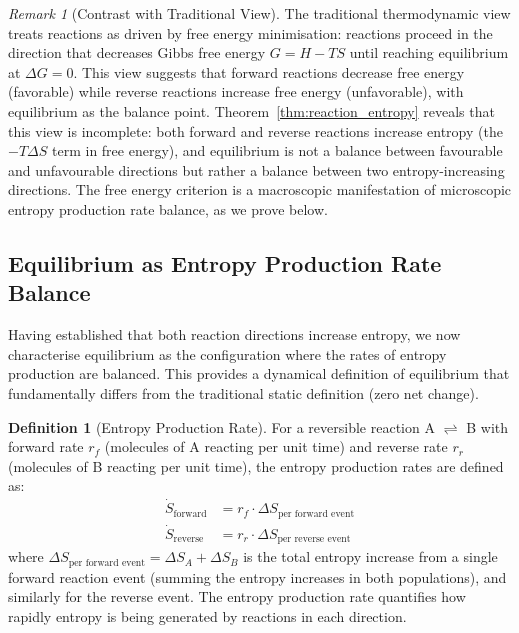 \documentclass[12pt,a4paper]{article}
\theoremstyle{definition}
\newtheorem{definition}[theorem]{Definition}
\theoremstyle{remark}
\newtheorem{remark}[theorem]{Remark}
\begin{document}
\begin{remark}[Contrast with Traditional View]
\label{rem:contrast_traditional_reaction}
The traditional thermodynamic view treats reactions as driven by free energy minimisation: reactions proceed in the direction that decreases Gibbs free energy $G = H - TS$ until reaching equilibrium at $\Delta G = 0$. This view suggests that forward reactions decrease free energy (favorable) while reverse reactions increase free energy (unfavorable), with equilibrium as the balance point. Theorem~\ref{thm:reaction_entropy} reveals that this view is incomplete: both forward and reverse reactions increase entropy (the $-T\Delta S$ term in free energy), and equilibrium is not a balance between favourable and unfavourable directions but rather a balance between two entropy-increasing directions. The free energy criterion is a macroscopic manifestation of microscopic entropy production rate balance, as we prove below.
\end{remark}

\subsection{Equilibrium as Entropy Production Rate Balance}

Having established that both reaction directions increase entropy, we now characterise equilibrium as the configuration where the rates of entropy production are balanced. This provides a dynamical definition of equilibrium that fundamentally differs from the traditional static definition (zero net change).

\begin{definition}[Entropy Production Rate]
\label{def:entropy_rate}
For a reversible reaction A $\rightleftharpoons$ B with forward rate $r_f$ (molecules of A reacting per unit time) and reverse rate $r_r$ (molecules of B reacting per unit time), the entropy production rates are defined as:
\begin{align}
\dot{S}_{\text{forward}} &= r_f \cdot \Delta S_{\text{per forward event}} \label{eq:forward_rate} \\
\dot{S}_{\text{reverse}} &= r_r \cdot \Delta S_{\text{per reverse event}} \label{eq:reverse_rate}
\end{align}
where $\Delta S_{\text{per forward event}} = \Delta S_A + \Delta S_B$ is the total entropy increase from a single forward reaction event (summing the entropy increases in both populations), and similarly for the reverse event. The entropy production rate quantifies how rapidly entropy is being generated by reactions in each direction.
\end{definition}
\end{document}
